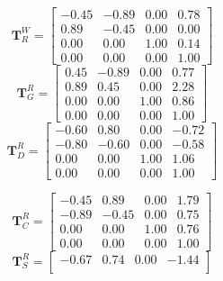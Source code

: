 \documentclass[12pt,a4paper]{article}
\newcommand{\mat}[1]{\mathbf{#1}}
\begin{document}
\noindent
\begin{tcolorbox}[enhanced,attach boxed title to top center={yshift=-3mm,yshifttext=-1mm}, colback=blue!5!white, colframe=blue!75!black, colbacktitle=blue!40!white, title=Homogeneous transforms for Random Pose 1,fonttitle=\bfseries, boxed title style={size=small,colframe=blue!50!black} ]

    \label{tab:q4_1}
    \begin{minipage}[t]{0.49\linewidth}
    \small
    \[
    \mat{T}^{W}_{R} =
    \begin{bmatrix}
     -0.45 & -0.89 & 0.00 & 0.78 \\
     0.89 &  -0.45 & 0.00 & 0.00 \\
     0.00 &  0.00 & 1.00 & 0.14 \\
     0.00 &  0.00 & 0.00 & 1.00
    \end{bmatrix}
    \]
    \vspace{8pt}
    \[
    \mat{T}^{R}_{G} =
    \begin{bmatrix}
     0.45 & -0.89 & 0.00 & 0.77 \\
     0.89 &  0.45 & 0.00 & 2.28 \\
     0.00 &  0.00 & 1.00 & 0.86 \\
     0.00 &  0.00 & 0.00 & 1.00
    \end{bmatrix}
    \]
    \vspace{8pt}
    \[
    \mat{T}^{R}_{D} =
    \begin{bmatrix}
     -0.60 &  0.80 & 0.00 & -0.72 \\
     -0.80 & -0.60 & 0.00 & -0.58 \\
      0.00 &  0.00 & 1.00 &  1.06 \\
      0.00 &  0.00 & 0.00 &  1.00
    \end{bmatrix}
    \]
    \end{minipage}\hfill
    \begin{minipage}[t]{0.49\linewidth}
    \small
    \[
    \mat{T}^{R}_{C} =
    \begin{bmatrix}
     -0.45 &  0.89 & 0.00 & 1.79 \\
     -0.89 & -0.45 & 0.00 & 0.75 \\
      0.00 &  0.00 & 1.00 & 0.76 \\
      0.00 &  0.00 & 0.00 & 1.00
    \end{bmatrix}
    \]
    \vspace{8pt}
    \[
    \mat{T}^{R}_{S} =
    \begin{bmatrix}
     -0.67 &  0.74 & 0.00 & -1.44 \\

\end{bmatrix}\]
\end{minipage}
\end{tcolorbox}
\end{document}
